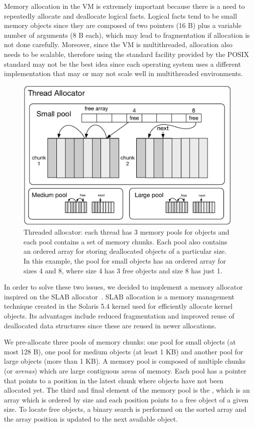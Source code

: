 
Memory allocation in the VM is extremely important because there is a need to
repeatedly allocate and deallocate logical facts. Logical facts tend to be small
memory objects since they are composed of two pointers (16 B) plus a variable
number of arguments (8 B each), which may lead to fragmentation if allocation is
not done carefully.  Moreover, since the VM is multithreaded, allocation also
needs to be scalable, therefore using the standard  facility
provided by the POSIX standard may not be the best idea since each operating
system uses a different implementation that may or may not scale well in
multithreaded environments.

\begin{figure}[ht]
   \begin{center}
      \includegraphics[width=0.7\linewidth]{figures/implementation/pool.pdf}
   \end{center}

   \caption{Threaded allocator: each thread has 3 memory pools for objects and
      each pool contains a set of memory chunks. Each pool also contains an
      ordered array for storing deallocated objects of a particular size. In
      this example, the pool for small objects has an ordered array for sizes 4
      and 8, where size 4 has 3 free objects and size 8 has just 1.}

   \label{fig:implementation:pool}
\end{figure}

In order to solve these two issues, we decided to implement a memory allocator
inspired on the SLAB allocator~\cite{Bonwick-94}. SLAB allocation is a memory
management technique created in the Solaris 5.4 kernel used for efficiently
allocate kernel objects. Its advantages include reduced fragmentation and
improved reuse of deallocated data structures since these are reused in newer
allocations.

We pre-allocate three pools of memory chunks: one pool for small objects (at
most 128 B), one pool for medium objects (at least 1 KB) and another pool for
large objects (more than 1 KB).  A memory pool is composed of multiple chunks
(or \emph{arenas}) which are large contiguous areas of memory. Each pool has a
 pointer that points to a position in the latest chunk where objects
have not been allocated yet. The third and final element of the memory pool is
the , which is an array which is ordered by size and each
position points to a free object of a given size. To locate free objects, a
binary search is performed on the sorted array and the array position is updated
to the next available object.

